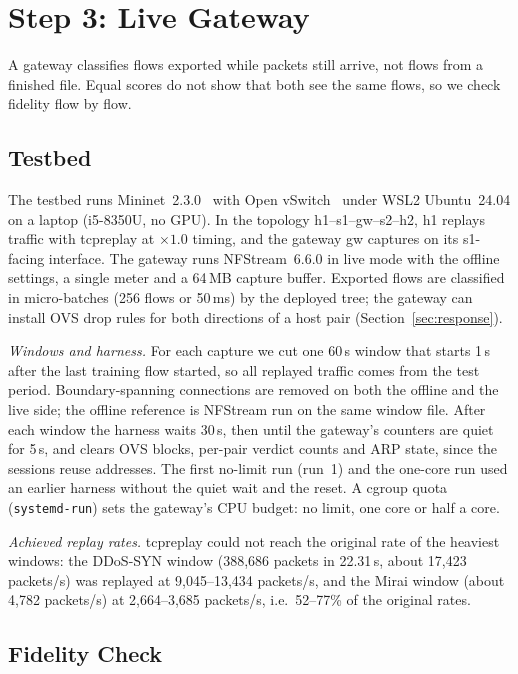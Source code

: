 \section{Step 3: Live Gateway}\label{sec:live}

A gateway classifies flows exported while packets still arrive, not flows from a finished file. Equal scores do not show that both see the same flows, so we check fidelity flow by flow.

\subsection{Testbed}\label{sec:testbed}

The testbed runs Mininet~2.3.0~\cite{lantz2010mininet} with Open vSwitch~\cite{pfaff2015ovs} under WSL2 Ubuntu~24.04 on a laptop (i5-8350U, no GPU). In the topology h1--s1--gw--s2--h2, h1 replays traffic with tcpreplay at $\times1.0$ timing, and the gateway gw captures on its s1-facing interface. The gateway runs NFStream~6.6.0 in live mode with the offline settings, a single meter and a 64\,MB capture buffer. Exported flows are classified in micro-batches (256 flows or 50\,ms) by the deployed tree; the gateway can install OVS drop rules for both directions of a host pair (Section~\ref{sec:response}).

\emph{Windows and harness.} For each capture we cut one 60\,s window that starts 1\,s after the last training flow started, so all replayed traffic comes from the test period. Boundary-spanning connections are removed on both the offline and the live side; the offline reference is NFStream run on the same window file. After each window the harness waits 30\,s, then until the gateway's counters are quiet for 5\,s, and clears OVS blocks, per-pair verdict counts and ARP state, since the sessions reuse addresses. The first no-limit run (run~1) and the one-core run used an earlier harness without the quiet wait and the reset. A cgroup quota (\texttt{systemd-run}) sets the gateway's CPU budget: no limit, one core or half a core.

\emph{Achieved replay rates.} tcpreplay could not reach the original rate of the heaviest windows: the DDoS-SYN window (388,686 packets in 22.31\,s, about 17,423 packets/s) was replayed at 9,045--13,434 packets/s, and the Mirai window (about 4,782 packets/s) at 2,664--3,685 packets/s, i.e.\ 52--77\% of the original rates.

\subsection{Fidelity Check}\label{sec:fidelity}

